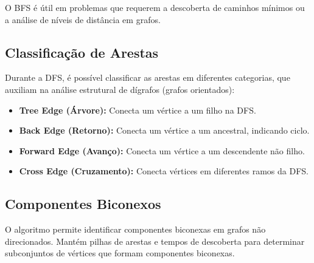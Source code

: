 O BFS é útil em problemas que requerem a descoberta de caminhos
mínimos ou a análise de níveis de distância em grafos.

\subsection{Classificação de Arestas}

Durante a DFS, é possível classificar as arestas em diferentes
categorias, que auxiliam na análise estrutural de dígrafos (grafos orientados):

\begin{itemize}
  \item \textbf{Tree Edge (Árvore):} Conecta um vértice a um filho na DFS.
  \item \textbf{Back Edge (Retorno):} Conecta um vértice a um
    ancestral, indicando ciclo.
  \item \textbf{Forward Edge (Avanço):} Conecta um vértice a um
    descendente não filho.
  \item \textbf{Cross Edge (Cruzamento):} Conecta vértices em
    diferentes ramos da DFS.
\end{itemize}

\subsection{Componentes Biconexos}

O algoritmo permite identificar componentes biconexas em grafos não
direcionados. Mantém pilhas de arestas e tempos de descoberta para
determinar subconjuntos de vértices que formam componentes biconexas.

